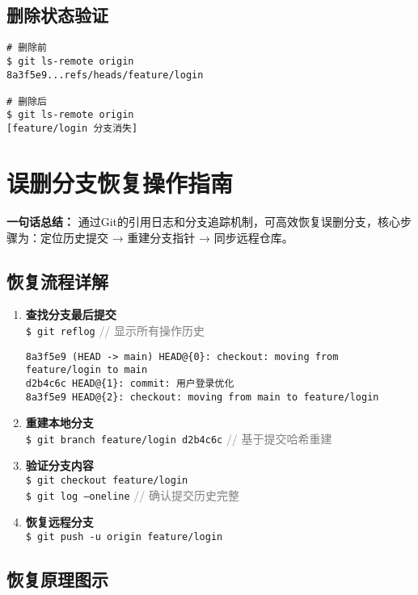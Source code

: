 \subsection{删除状态验证}
\begin{verbatim}
# 删除前
$ git ls-remote origin
8a3f5e9...refs/heads/feature/login

# 删除后
$ git ls-remote origin
[feature/login 分支消失]
\end{verbatim}

\section{误删分支恢复操作指南}
\textbf{一句话总结：}  
通过Git的引用日志和分支追踪机制，可高效恢复误删分支，核心步骤为：定位历史提交 → 重建分支指针 → 同步远程仓库。

\subsection{恢复流程详解}
\begin{enumerate}[leftmargin=*, nosep]
    \item \textbf{查找分支最后提交} \\
    \texttt{\$ git reflog} \quad \textcolor{gray}{// 显示所有操作历史}
    \begin{verbatim}
8a3f5e9 (HEAD -> main) HEAD@{0}: checkout: moving from feature/login to main
d2b4c6c HEAD@{1}: commit: 用户登录优化
8a3f5e9 HEAD@{2}: checkout: moving from main to feature/login
    \end{verbatim}
    
    \item \textbf{重建本地分支} \\
    \texttt{\$ git branch feature/login d2b4c6c} \quad \textcolor{gray}{// 基于提交哈希重建}
    
    \item \textbf{验证分支内容} \\
    \texttt{\$ git checkout feature/login} \\
    \texttt{\$ git log --oneline} \quad \textcolor{gray}{// 确认提交历史完整}
    
    \item \textbf{恢复远程分支} \\
    \texttt{\$ git push -u origin feature/login}
\end{enumerate}

\subsection{恢复原理图示}
\begin{center}
\end{center}

